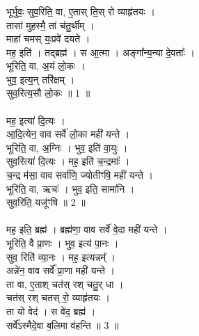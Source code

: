 \subsubsection{}
भूर्भुवः॒ सुव॒रिति॒ वा, ए॒तास् ति॒स् रो व्याहृ॑तयः ।\\
तासा॑ मुहस्मै॒ तां च॑तु॒र्थीम् । \\
माहा॑ चमस् यः॒प्रवे॑ दयते ।\\
मह॒ इति॑ । तद्ब्रह्म॑ । स आ॒त्मा । अङ्गा᳚न्य॒न्या दे॒वताः᳚ ।\\
भूरिति॒ वा, अ॒यं लो॒कः । \\
भुव॒ इत्य॒न् तरि॑क्षम् ।\\
सुव॒रित्य॒सौ लो॒कः ॥ 1 ॥\\
\\
मह॒ इत्या॑ दि॒त्यः । \\
आ॒दि॒त्येन॒ वाव सर्वे॑ लो॒का मही॑ यन्ते ।\\
भूरिति॒ वा, अ॒ग्निः । भुव॒ इति॑ वा॒युः । \\
सुव॒रित्या॑ दि॒त्यः । मह॒ इति॑ च॒न्द्रमाः᳚ । \\
च॒न्द्र म॑सा॒ वाव सर्वा॑णि॒ ज्योतीꣳषि॒ मही॑ यन्ते ।\\
भूरिति॒ वा, ऋचः॑ । भुव॒ इति॒ सामा॑नि ।\\
सुव॒रिति॒ यजू॑ꣳषि ॥ 2 ॥\\
\\
मह॒ इति॒ ब्रह्म॑ । ब्रह्म॑णा॒ वाव सर्वे॑ वे॒दा मही॑ यन्ते ।\\
भूरिति॒ वै प्रा॒णः । भुव॒ इत्य॑ पा॒नः । \\
सुव॒ रिति॑ व्या॒नः । मह॒ इत्यन्नम्᳚ । \\
अन्ने॑न॒ वाव सर्वे᳚ प्रा॒णा मही॑ यन्ते ।\\
ता वा, ए॒ताश् चत॑स् रश् चतु॒र् धा ।\\
चत॑स् रश् चतस् रो॒ व्याहृ॑तयः । \\
ता यो वेद॑ । स वे॑द॒ ब्रह्म॑ । \\
सर्वे᳚ऽस्मैदे॒वा ब॒लिमा व॑हन्ति ॥ 3 ॥\\
